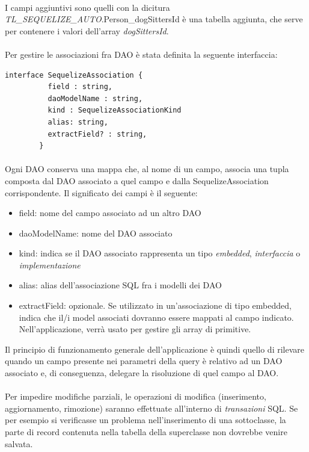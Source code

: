 \documentclass[a4paper, 12pt]{report}
\begin{document}
      \paragraph*{}
      I campi aggiuntivi sono quelli con la dicitura \emph{TL_SEQUELIZE_AUTO}.Person_dogSittersId è una tabella aggiunta, che serve per contenere i valori dell'array \emph{dogSittersId}.
      \paragraph*{}
      Per gestire le associazioni fra DAO è stata definita la seguente interfaccia:
      \begin{Verbatim}[samepage=true]
        interface SequelizeAssociation {
          field : string,
          daoModelName : string,
          kind : SequelizeAssociationKind
          alias: string,
          extractField? : string,
        }
      \end{Verbatim}
      \paragraph*{}
      Ogni DAO conserva una mappa che, al nome di un campo, associa una tupla composta dal DAO associato a quel campo e dalla SequelizeAssociation corrispondente.
      Il significato dei campi è il seguente:
      \begin{itemize}
        \item field: nome del campo associato ad un altro DAO
        \item daoModelName: nome del DAO associato
        \item kind: indica se il DAO associato rappresenta un tipo \emph{embedded}, \emph{interfaccia} o \emph{implementazione}
        \item alias: alias dell'associazione SQL fra i modelli dei DAO
        \item extractField: opzionale. Se utilizzato in un'associazione di tipo embedded, indica che il/i model associati dovranno essere mappati al campo indicato.
                            Nell'applicazione, verrà usato per gestire gli array di primitive.
      \end{itemize}
      Il principio di funzionamento generale dell'applicazione è quindi quello di rilevare quando un campo presente nei parametri della query è relativo ad un DAO associato e, di conseguenza, delegare la risoluzione di quel campo al DAO.
      \paragraph*{}
      Per impedire modifiche parziali, le operazioni di modifica (inserimento, aggiornamento, rimozione) saranno effettuate all'interno di \emph{transazioni} SQL.
      Se per esempio si verificasse un problema nell'inserimento di una sottoclasse, la parte di record contenuta nella tabella della superclasse non dovrebbe venire salvata.
    \newpage
\end{document}
